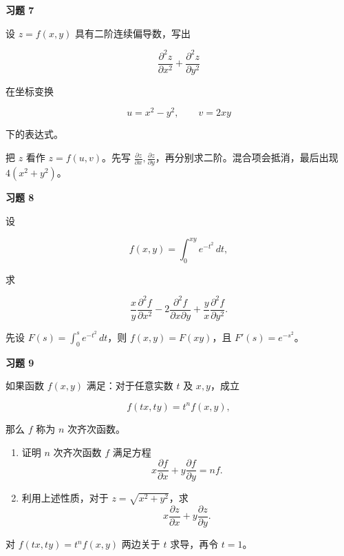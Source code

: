 \begin{exercisebox}
\textbf{习题 7}

设 \(z=f(x,y)\) 具有二阶连续偏导数，写出

\[
        \frac{\partial^2 z}{\partial x^2}
        +
        \frac{\partial^2 z}{\partial y^2}
      \]

在坐标变换

\[
        u=x^2-y^2,\qquad v=2xy
      \]

下的表达式。

\begin{hintbox}
把 \(z\) 看作 \(z=f(u,v)\)。先写 \(\frac{\partial z}{\partial x},\frac{\partial z}{\partial y}\)，再分别求二阶。混合项会抵消，最后出现 \(4(x^2+y^2)\)。
\end{hintbox}
\end{exercisebox}

\begin{exercisebox}
\textbf{习题 8}

设

\[
        f(x,y)=\int_0^{xy}e^{-t^2}\,dt,
      \]

求

\[
        \frac{x}{y}\frac{\partial^2 f}{\partial x^2}
        -2\frac{\partial^2 f}{\partial x\partial y}
        +\frac{y}{x}\frac{\partial^2 f}{\partial y^2}.
      \]

\begin{hintbox}
先设 \(F(s)=\int_0^s e^{-t^2}\,dt\)，则 \(f(x,y)=F(xy)\)，且 \(F'(s)=e^{-s^2}\)。
\end{hintbox}
\end{exercisebox}

\begin{exercisebox}
\textbf{习题 9}

如果函数 \(f(x,y)\) 满足：对于任意实数 \(t\) 及 \(x,y\)，成立

\[
        f(tx,ty)=t^n f(x,y),
      \]

那么 \(f\) 称为 \(n\) 次齐次函数。

\begin{enumerate}
 \item 证明 \(n\) 次齐次函数 \(f\) 满足方程 \[
            x\frac{\partial f}{\partial x}
            +
            y\frac{\partial f}{\partial y}
            =
            nf.
          \]
 \item 利用上述性质，对于 \(z=\sqrt{x^2+y^2}\)，求 \[
            x\frac{\partial z}{\partial x}
            +
            y\frac{\partial z}{\partial y}.
          \]
 \end{enumerate}

\begin{hintbox}
对 \(f(tx,ty)=t^n f(x,y)\) 两边关于 \(t\) 求导，再令 \(t=1\)。
\end{hintbox}
\end{exercisebox}

